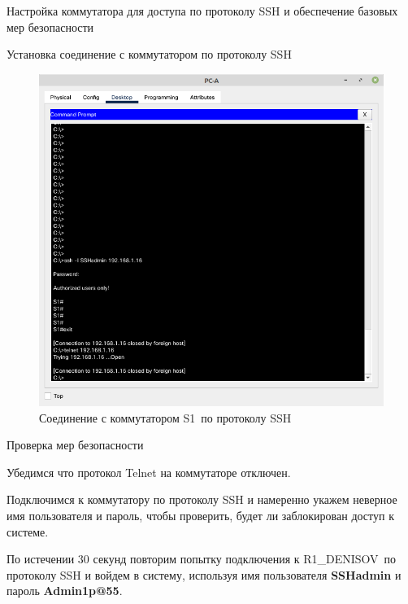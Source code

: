 \documentclass[a4paper,14pt]{extarticle}
\newcommand{\router}{R1\_DENISOV~}
\newcommand{\switch}{S1~}
\begin{document}
\begin{mypart}{Настройка коммутатора для доступа по протоколу SSH и
		обеспечение базовых мер безопасности}
\begin{step}{Установка соединение с коммутатором по протоколу SSH}
	\begin{figure}[h!]
		\centering
		\includegraphics[width=0.6\linewidth]{images/pr8-ssh-to-switch}
		\caption{Соединение с коммутатором \switch по протоколу SSH}
		\label{fig:pr8-ssh-to-switch}
	\end{figure}
	
\end{step}

\begin{step}{Проверка мер безопасности}
	
	
Убедимся что протокол Telnet на коммутаторе отключен.

Подключимся к коммутатору по протоколу SSH и намеренно укажем неверное имя пользователя
и пароль, чтобы проверить, будет ли заблокирован доступ к системе.

По истечении 30 секунд повторим попытку подключения к \router по протоколу SSH и
войдем в систему, используя имя пользователя \textbf{SSHadmin} и пароль \textbf{Admin1p@55}.

\end{step}
\end{mypart}
\end{document}
